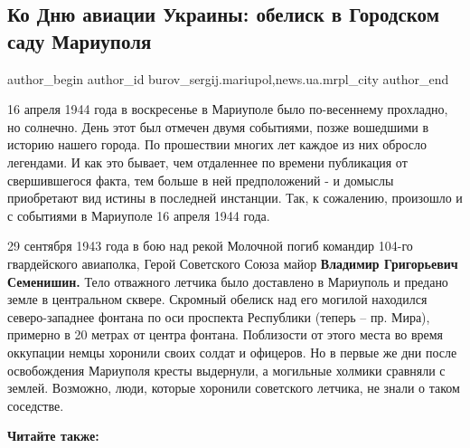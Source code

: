  
 
 
 
 
 
\subsection{Ко Дню авиации Украины: обелиск в Городском саду Мариуполя}
\label{sec:31_08_2019.stz.news.ua.mrpl_city.1.aviacia_obelisk_gorsad_mariupol}
 
\ifcmt
 author_begin
   author_id burov_sergij.mariupol,news.ua.mrpl_city
 author_end
\fi


16 апреля 1944 года в воскресенье в Мариуполе было по-весеннему прохладно, но
солнечно. День этот был отмечен двумя событиями, позже вошедшими в историю
нашего города. По прошествии многих лет каждое из них обросло легендами. И как
это бывает, чем отдаленнее по времени публикация от свершившегося факта, тем
больше в ней предположений - и домыслы приобретают вид истины в последней
инстанции. Так, к сожалению, произошло и с событиями в Мариуполе 16 апреля 1944
года.

29 сентября 1943 года в бою над рекой Молочной погиб командир 104-го
гвардейского авиаполка, Герой Советского Союза майор \textbf{Владимир Григорьевич
Семенишин.} Тело отважного летчика было доставлено в Мариуполь и предано земле в
центральном сквере. Скромный обелиск над его могилой находился северо-западнее
фонтана по оси проспекта Республики (теперь – пр. Мира), примерно в 20 метрах
от центра фонтана. Поблизости от этого места во время оккупации немцы хоронили
своих солдат и офицеров. Но в первые же дни после освобождения Мариуполя кресты
выдернули, а могильные холмики сравняли с землей. Возможно, люди, которые
хоронили советского летчика, не знали о таком соседстве.

\textbf{Читайте также:} 


